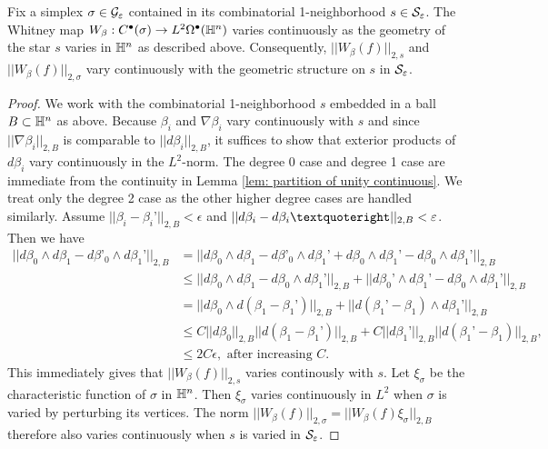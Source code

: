 \begin{lem} \label{lem: forms continuous} Fix a simplex $\sigma\in\mathcal G_\varepsilon$ contained in its combinatorial 1-neighborhood $s\in \mathcal S_\varepsilon$.
The Whitney map $W_{\beta}: C^{\bullet}(\sigma)\to L^2\Omega^{\bullet}(\mathbb H^n)$ varies continuously as the geometry of the star $s$ varies in $\mathbb H^n$ as described above. Consequently, $||W_{\beta}(f)||_{2,s}$ and $|| W_{\beta}(f) ||_{2,\sigma}$ vary continuously with the geometric structure on $s$ in $\mathcal S_\varepsilon$.
 \end{lem}
\begin{proof} We work with the combinatorial 1-neighborhood $s$ embedded in a ball $B\subset \mathbb H^n$ as above. Because $\beta_i$ and $\nabla \beta_i$ vary continuously with $s$ and since $||\nabla\beta_i||_{2,B} $ is comparable to $||d\beta_i||_{2,B}$, it suffices to show that exterior products of $d\beta_i$ vary continuously in the $L^2$-norm. The degree 0 case and  degree 1 case are immediate from the continuity in Lemma \ref{lem: partition of unity continuous}. We treat only the degree 2 case as the other higher degree cases are handled similarly. Assume $||\beta_i - \beta_i’||_{2,B} < \epsilon$ and $||d\beta_i - d\beta_i’||_{2,B}<\e$. Then we have \begin{align*}
||d\beta_0\wedge d\beta_1 - d\beta’_0\wedge d\beta_1’||_{2,B} &=||d\beta_0\wedge d\beta_1 - d\beta’_0\wedge d\beta_1’ + d\beta_0 \wedge d\beta_1’ - d\beta_0 \wedge d\beta_1’||_{2,B} \\
&\leq ||d\beta_0\wedge d\beta_1  - d\beta_0 \wedge d\beta_1’||_{2,B} + || d\beta_0’ \wedge d\beta_1’ - d\beta_0\wedge d\beta_1’||_{2,B} \\
&= ||d\beta_0\wedge d(\beta_1 - \beta_1’)||_{2,B} + ||d(\beta_1’ - \beta_1)\wedge d\beta_1’||_{2,B}\\
&\leq C||d\beta_0||_{2,B} ||d(\beta_1-\beta_1’)||_{2,B} + C||d\beta_1’
||_{2,B} ||d(\beta_1’-\beta_1)||_{2,B},\\
&\leq 2C\epsilon, \text{~after increasing $C$.}
\end{align*}
This immediately gives that $||W_{\beta}(f)||_{2,s}$ varies continously with $s$. Let $\xi_{\sigma}$ be the characteristic function of $\sigma$ in $\mathbb H^n$. Then $\xi_{\sigma}$ varies continuously in $L^2$ when $\sigma$ is varied by perturbing its vertices. The norm $||W_{\beta}(f)||_{2,\sigma} = ||W_{\beta}(f)\xi_{\sigma}||_{2,B}$ therefore also varies continuously when $s$ is varied in $\mathcal S_\varepsilon$.
\end{proof}

